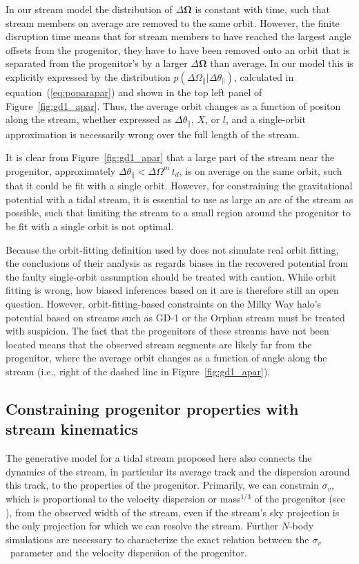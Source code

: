 \documentclass[12pt,preprint]{aastex}
\newcommand{\ie}{i.e.}
\newcommand{\eqnname}{equation}
\newcommand{\equationname}{\eqnname}
\renewcommand{\figurename}{Figure}
\renewcommand{\vec}[1]{\ensuremath{\mathbf{#1}}}
\newcommand{\veco}{\ensuremath{\vec{\Omega}}}
\newcommand{\sigv}{\ensuremath{\sigma_v}}
\newcommand{\apar}{\ensuremath{\theta_\parallel}}
\newcommand{\opar}{\ensuremath{\Omega_\parallel}}
\begin{document}
In our stream model the distribution of $\Delta \veco$ is constant
with time, such that stream members on average are removed to the same
orbit. However, the finite disruption time means that for stream
members to have reached the largest angle offsets from the progenitor,
they have to have been removed onto an orbit that is separated from
the progenitor's by a larger $\Delta \veco$ than average. In our model
this is explicitly expressed by the distribution $p(\Delta
\opar|\Delta \apar)$, calculated in \equationname~(\ref{eq:poparapar})
and shown in the top left panel of
\figurename~\ref{fig:gd1_apar}. Thus, the average orbit changes as a
function of positon along the stream, whether expressed as $\Delta
\apar$, $X$, or $l$, and a single-orbit approximation is necessarily
wrong over the full length of the stream.

It is clear from \figurename~\ref{fig:gd1_apar} that a large part of
the stream near the progenitor, approximately $\Delta \apar < \Delta
\Omega^m\,t_d$, is on average on the same orbit, such that it could be
fit with a single orbit. However, for constraining the gravitational
potential with a tidal stream, it is essential to use as large an arc
of the stream as possible, such that limiting the stream to a small
region around the progenitor to be fit with a single orbit is not
optimal.

Because the orbit-fitting definition used by \citet{Sanders13a} does
not simulate real orbit fitting, the conclusions of their analysis as
regards biases in the recovered potential from the faulty single-orbit
assumption should be treated with caution. While orbit fitting is
wrong, how biased inferences based on it are is therefore still an
open question. However, orbit-fitting-based constraints on the Milky
Way halo's potential based on streams such as GD-1 or the Orphan
stream must be treated with suspicion. The fact that the progenitors
of these streams have not been located means that the observed stream
segments are likely far from the progenitor, where the average orbit
changes as a function of angle along the stream (\ie, right of the
dashed line in \figurename~\ref{fig:gd1_apar}).


\subsection{Constraining progenitor properties with stream kinematics}

The generative model for a tidal stream proposed here also connects
the dynamics of the stream, in particular its average track and the
dispersion around this track, to the properties of the
progenitor. Primarily, we can constrain $\sigv$, which is proportional
to the velocity dispersion or mass$^{1/3}$ of the progenitor (see
\citealt{Sanders13a}), from the observed width of the stream, even if
the stream's sky projection is the only projection for which we can
resolve the stream. Further $N$-body simulations are necessary to
characterize the exact relation between the \sigv\ parameter and the
velocity dispersion of the progenitor.
\end{document}
